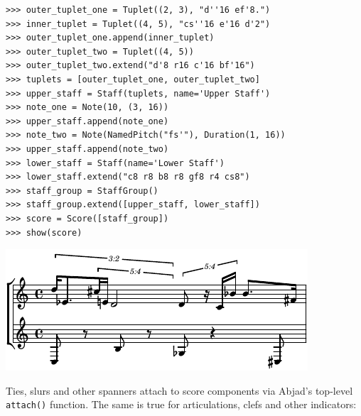 \documentclass{article}
\begin{document}

\begin{lstlisting}
>>> outer_tuplet_one = Tuplet((2, 3), "d''16 ef'8.")
>>> inner_tuplet = Tuplet((4, 5), "cs''16 e'16 d'2")
>>> outer_tuplet_one.append(inner_tuplet)
>>> outer_tuplet_two = Tuplet((4, 5))
>>> outer_tuplet_two.extend("d'8 r16 c'16 bf'16")
>>> tuplets = [outer_tuplet_one, outer_tuplet_two]
>>> upper_staff = Staff(tuplets, name='Upper Staff')
>>> note_one = Note(10, (3, 16))
>>> upper_staff.append(note_one)
>>> note_two = Note(NamedPitch("fs'"), Duration(1, 16))
>>> upper_staff.append(note_two)
>>> lower_staff = Staff(name='Lower Staff')
>>> lower_staff.extend("c8 r8 b8 r8 gf8 r4 cs8")
>>> staff_group = StaffGroup()
>>> staff_group.extend([upper_staff, lower_staff])
>>> score = Score([staff_group])
>>> show(score)
\end{lstlisting}
\includegraphics{assets/lilypond-1c885bfebd0d1fe0357ba25ba72d36ba.pdf}

\noindent Ties, slurs and other spanners attach to score components via Abjad's
top-level \texttt{attach()} function. The same is true for articulations, clefs and other indicators:

\end{document}
